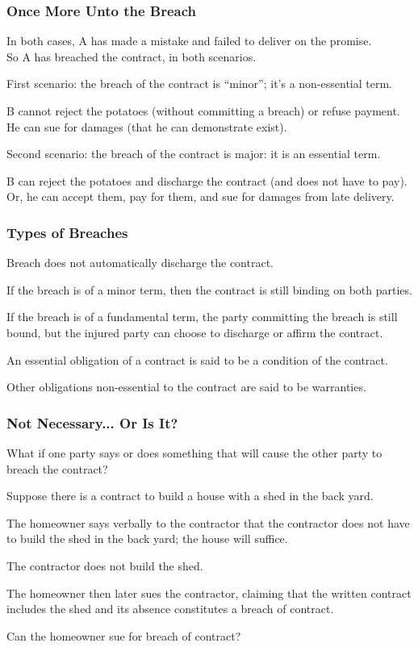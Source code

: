\begin{frame}
\frametitle{Once More Unto the Breach}

In both cases, A has made a mistake and failed to deliver on the promise.\\
\quad So A has breached the contract, in both scenarios.

First scenario: the breach of the contract is ``minor''; it's a non-essential term.

B cannot reject the potatoes (without committing a breach) or refuse payment.\\
\quad He can sue for damages (that he can demonstrate exist).

Second scenario: the breach of the contract is major: it is an essential term.

B can reject the potatoes and discharge the contract (and does not have to pay).\\
\quad Or, he can accept them, pay for them, and sue for damages from late delivery.

\end{frame}


\begin{frame}
\frametitle{Types of Breaches}

Breach does not automatically discharge the contract.

If the breach is of a minor term, then the contract is still binding on both parties.

If the breach is of a fundamental term, the party committing the breach is still bound, but the injured party can choose to discharge or affirm the contract.

An essential obligation of a contract is said to be a \alert{condition} of the contract.

Other obligations non-essential to the contract are said to be \alert{warranties}.

\end{frame}

\begin{frame}
\frametitle{Not Necessary... Or Is It?}

What if one party says or does something that will cause the other party to breach the contract?

Suppose there is a contract to build a house with a shed in the back yard.

The homeowner says verbally to the contractor that the contractor does not have to build the shed in the back yard; the house will suffice.

The contractor does not build the shed.

The homeowner then later sues the contractor, claiming that the written contract includes the shed and its absence constitutes a breach of contract.

Can the homeowner sue for breach of contract?

\end{frame}



